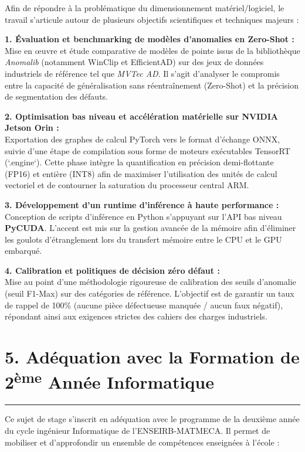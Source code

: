 \documentclass[11pt,a4paper]{article}
\begin{document}
Afin de répondre à la problématique du dimensionnement matériel/logiciel, le travail s'articule autour de plusieurs objectifs scientifiques et techniques majeurs :

\textbf{1. Évaluation et benchmarking de modèles d'anomalies en Zero-Shot :} \\
Mise en œuvre et étude comparative de modèles de pointe issus de la bibliothèque \emph{Anomalib} (notamment WinClip et EfficientAD) sur des jeux de données industriels de référence tel que \emph{MVTec AD}. Il s'agit d'analyser le compromis entre la capacité de généralisation sans réentraînement (Zero-Shot) et la précision de segmentation des défauts.

\textbf{2. Optimisation bas niveau et accélération matérielle sur NVIDIA Jetson Orin :} \\
Exportation des graphes de calcul PyTorch vers le format d'échange ONNX, suivie d'une étape de compilation sous forme de moteurs exécutables TensorRT (`.engine`). Cette phase intègre la quantification en précision demi-flottante (FP16) et entière (INT8) afin de maximiser l'utilisation des unités de calcul vectoriel et de contourner la saturation du processeur central ARM.

\textbf{3. Développement d'un runtime d'inférence à haute performance :} \\
Conception de scripts d'inférence en Python s'appuyant sur l'API bas niveau \textbf{PyCUDA}. L'accent est mis sur la gestion avancée de la mémoire afin d'éliminer les goulots d'étranglement lors du transfert mémoire entre le CPU et le GPU embarqué.

\textbf{4. Calibration et politiques de décision zéro défaut :} \\
Mise au point d'une méthodologie rigoureuse de calibration des seuils d'anomalie (seuil F1-Max) sur des catégories de référence. L'objectif est de garantir un taux de rappel de 100\% (aucune pièce défectueuse manquée / aucun faux négatif), répondant ainsi aux exigences strictes des cahiers des charges industriels.

\section*{\color{darkBlue} 5. Adéquation avec la Formation de 2\textsuperscript{ème} Année Informatique}
\hrule
\vspace{0.2cm}

Ce sujet de stage s'inscrit en adéquation avec le programme de la deuxième année du cycle ingénieur Informatique de l'ENSEIRB-MATMECA. Il permet de mobiliser et d'approfondir un ensemble de compétences enseignées à l'école :
\end{document}
